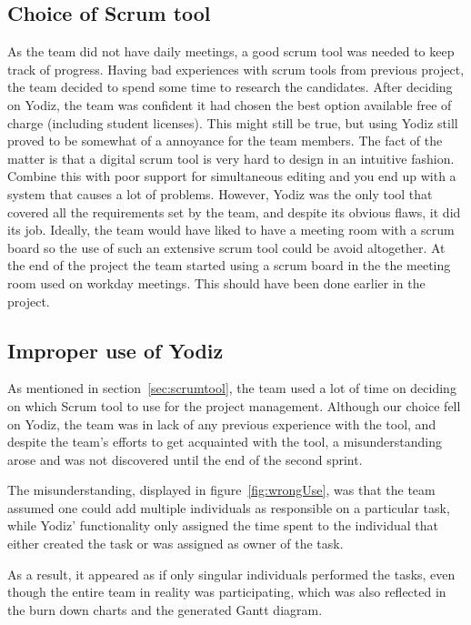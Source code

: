 \subsection{Choice of Scrum tool}
\label{sec:choiceScrumTool}
As the team did not have daily meetings, a good scrum tool was needed to keep track of progress. Having bad experiences with scrum tools from previous project, the team decided to spend some time to research the candidates. After deciding on Yodiz, the team was confident it had chosen the best option available free of charge (including student licenses). This might still be true, but using Yodiz still proved to be somewhat of a annoyance for the team members. The fact of the matter is that a digital scrum tool is very hard to design in an intuitive fashion. Combine this with poor support for simultaneous editing and you end up with a system that causes a lot of problems. However, Yodiz was the only tool that covered all the requirements set by the team, and despite its obvious flaws, it did its job. Ideally, the team would have liked to have a meeting room with a scrum board so the use of such an extensive scrum tool could be avoid altogether. At the end of the project the team started using a scrum board in the the meeting room used on workday meetings. This should have been done earlier in the project.

\subsection{Improper use of Yodiz}
\label{sec:improperScrum}
As mentioned in section~\ref{sec:scrumtool}, the team used a lot of time on
deciding on which Scrum tool to use for the project management. Although our
choice fell on Yodiz, the team was in lack of any previous experience with the
tool, and despite the team's efforts to get acquainted with the tool, a
misunderstanding arose and was not discovered until the end of the second
sprint.

The misunderstanding, displayed in figure~\ref{fig:wrongUse}, was that the team
assumed one could add multiple individuals as responsible on a particular task,
while Yodiz' functionality only assigned the time spent to the individual that
either created the task or was assigned as owner of the task.

As a result, it appeared as if only singular individuals performed the tasks,
even though the entire team in reality was participating, which was also
reflected in the burn down charts and the generated Gantt diagram. 

